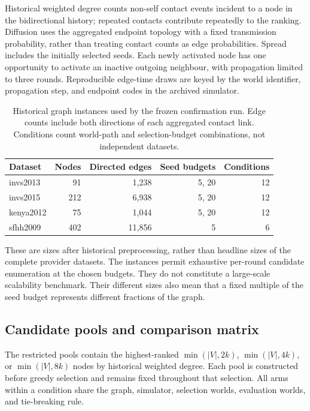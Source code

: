 \documentclass[smallextended]{svjour3}
\begin{document}
Historical weighted degree counts non-self contact events incident to a node in the bidirectional history; repeated contacts contribute repeatedly to the ranking. Diffusion uses the aggregated endpoint topology with a fixed transmission probability, rather than treating contact counts as edge probabilities. Spread includes the initially selected seeds. Each newly activated node has one opportunity to activate an inactive outgoing neighbour, with propagation limited to three rounds. Reproducible edge-time draws are keyed by the world identifier, propagation step, and endpoint codes in the archived simulator.

\begin{table}[tbp]
\caption{Historical graph instances used by the frozen confirmation run. Edge counts include both directions of each aggregated contact link. Conditions count world-path and selection-budget combinations, not independent datasets.}
\label{tab:2}
\begin{tabularx}{\linewidth}{@{}lrrrr@{}}
\toprule
\textbf{Dataset} & \textbf{Nodes} & \textbf{Directed edges} & \textbf{Seed budgets} & \textbf{Conditions} \\
\midrule
invs2013 & 91 & 1,238 & 5, 20 & 12 \\
invs2015 & 212 & 6,938 & 5, 20 & 12 \\
kenya2012 & 75 & 1,044 & 5, 20 & 12 \\
sfhh2009 & 402 & 11,856 & 5 & 6 \\
\bottomrule
\end{tabularx}
\end{table}

These are sizes after historical preprocessing, rather than headline sizes of the complete provider datasets. The instances permit exhaustive per-round candidate enumeration at the chosen budgets. They do not constitute a large-scale scalability benchmark. Their different sizes also mean that a fixed multiple of the seed budget represents different fractions of the graph.


\subsection{Candidate pools and comparison matrix}

The restricted pools contain the highest-ranked \(\min(|V|,2k)\), \(\min(|V|,4k)\), or \(\min(|V|,8k)\) nodes by historical weighted degree. Each pool is constructed before greedy selection and remains fixed throughout that selection. All arms within a condition share the graph, simulator, selection worlds, evaluation worlds, and tie-breaking rule.
\end{document}
